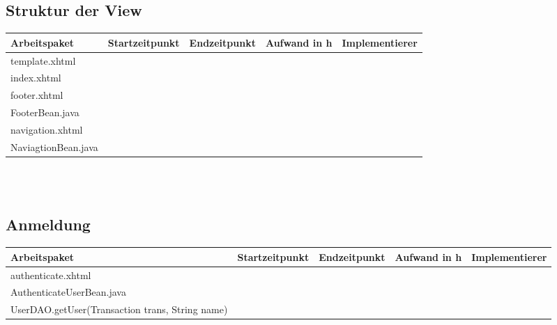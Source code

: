 \documentclass[12pt,a4paper]{scrreprt}
\begin{document}
\begin{landscape}
    \subsection{Struktur der View}
   	\begin{tabular}{|p{10cm}|p{4cm}|p{3cm}|p{3cm}|p{3cm}|}
    	\hline  \textbf{Arbeitspaket} & \textbf{Startzeitpunkt} & \textbf{Endzeitpunkt} & \textbf{Aufwand in h} & \textbf{Implementierer} \\ 
    	\hline   template.xhtml                   &                            &                             &                     &\\
    	\hline   index.xhtml                      &                            &                             &                     &\\
    	\hline   footer.xhtml                     &                            &                             &                     &\\ 
    	\hline   FooterBean.java                  &                            &                             &                     &\\ 
    	\hline   navigation.xhtml                 &                            &                             &                     &\\ 
    	\hline   NaviagtionBean.java              &                            &                             &                     &\\ 
    	\hline 
   	\end{tabular} \ \\
   	\ \\
   	
   	\subsection{Anmeldung}
   	\begin{tabular}{|p{10cm}|p{4cm}|p{3cm}|p{3cm}|p{3cm}|}
   		\hline  \textbf{Arbeitspaket} & \textbf{Startzeitpunkt} & \textbf{Endzeitpunkt} & \textbf{Aufwand in h} & \textbf{Implementierer} \\ 
   		\hline   authenticate.xhtml                                   &                            &                             &                     &\\
   		\hline   AuthenticateUserBean.java                            &                            &                             &                     &\\ 
   		\hline   UserDAO.getUser(Transaction trans, String name)      &                            &                             &                     &\\ 
   		\hline 
   	\end{tabular} \ \\
   	\ \\
   	

\end{landscape}
\end{document}

